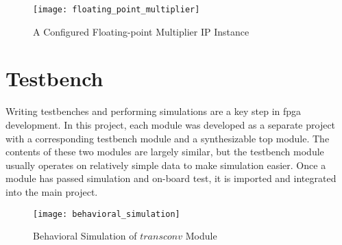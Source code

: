 \begin{figure}[h]
  \centering
  \texttt{[image: floating\_point\_multiplier]}
  \caption{A Configured Floating-point Multiplier IP Instance}
  \label{fig:floating_point_multiplier}
\end{figure}

\section{Testbench}

Writing testbenches and performing simulations are a key step in \gls{fpga} development. In this project,
each module was developed as a separate project with a corresponding testbench module and a synthesizable
top module. The contents of these two modules are largely similar, but the testbench module usually operates
on relatively simple data to make simulation easier. Once a module has passed simulation and on-board test,
it is imported and integrated into the main project.

\begin{figure}[h]
  \centering
  \texttt{[image: behavioral\_simulation]}
  \caption{Behavioral Simulation of $transconv$ Module}
  \label{fig:behavioral_simulation}
\end{figure}

\clearpage %
